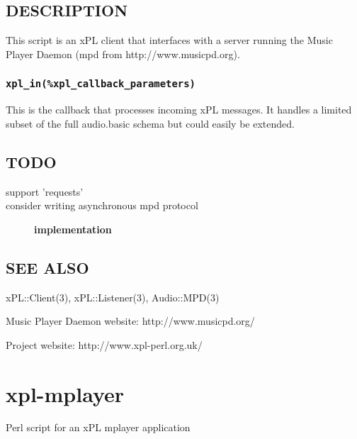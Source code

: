 \subsection*{DESCRIPTION\label{xpl-mpd_DESCRIPTION}}


This script is an xPL client that interfaces with a server running
the Music Player Daemon (mpd from http://www.musicpd.org).

\subsubsection*{\texttt{xpl\_in(\%xpl\_callback\_parameters)}\label{xpl-mpd_xpl_in_xpl_callback_parameters_}}


This is the callback that processes incoming xPL messages.  It handles
a limited subset of the full audio.basic schema but could easily be
extended.

\subsection*{TODO\label{xpl-mpd_TODO}}
\begin{description}

\item[{support 'requests'}] \mbox{}
\item[{consider writing asynchronous mpd protocol}] \textbf{implementation}\end{description}
\subsection*{SEE ALSO\label{xpl-mpd_SEE_ALSO}}


xPL::Client(3), xPL::Listener(3), Audio::MPD(3)



Music Player Daemon website: http://www.musicpd.org/



Project website: http://www.xpl-perl.org.uk/

\section{xpl-mplayer\label{xpl-mplayer}}


Perl script for an xPL mplayer application

